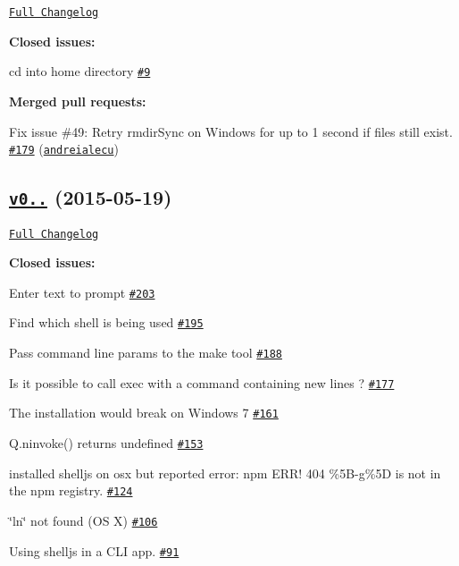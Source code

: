 \href{https://github.com/shelljs/shelljs/compare/v0.5.0...v0.5.1}{\tt Full Changelog}

{\bfseries Closed issues\+:}


\begin{DoxyItemize}
\item cd into home directory \href{https://github.com/shelljs/shelljs/issues/9}{\tt \#9}
\end{DoxyItemize}

{\bfseries Merged pull requests\+:}


\begin{DoxyItemize}
\item Fix issue \#49\+: Retry rmdir\+Sync on Windows for up to 1 second if files still exist. \href{https://github.com/shelljs/shelljs/pull/179}{\tt \#179} (\href{https://github.com/andreialecu}{\tt andreialecu})
\end{DoxyItemize}

\subsection*{\href{https://github.com/shelljs/shelljs/tree/v0.5.0}{\tt v0..} (2015-\/05-\/19)}

\href{https://github.com/shelljs/shelljs/compare/v0.3.0...v0.5.0}{\tt Full Changelog}

{\bfseries Closed issues\+:}


\begin{DoxyItemize}
\item Enter text to prompt \href{https://github.com/shelljs/shelljs/issues/203}{\tt \#203}
\item Find which shell is being used \href{https://github.com/shelljs/shelljs/issues/195}{\tt \#195}
\item Pass command line params to the make tool \href{https://github.com/shelljs/shelljs/issues/188}{\tt \#188}
\item Is it possible to call exec with a command containing new lines ? \href{https://github.com/shelljs/shelljs/issues/177}{\tt \#177}
\item The installation would break on Windows 7 \href{https://github.com/shelljs/shelljs/issues/161}{\tt \#161}
\item Q.\+ninvoke() returns undefined \href{https://github.com/shelljs/shelljs/issues/153}{\tt \#153}
\item installed shelljs on osx but reported error\+: npm E\+R\+R! 404 \textquotesingle{}\%5\+B-\/g\%5D\textquotesingle{} is not in the npm registry. \href{https://github.com/shelljs/shelljs/issues/124}{\tt \#124}
\item \char`\"{}ln\char`\"{} not found (OS X) \href{https://github.com/shelljs/shelljs/issues/106}{\tt \#106}
\item Using shelljs in a C\+LI app. \href{https://github.com/shelljs/shelljs/issues/91}{\tt \#91}
\end{DoxyItemize}

